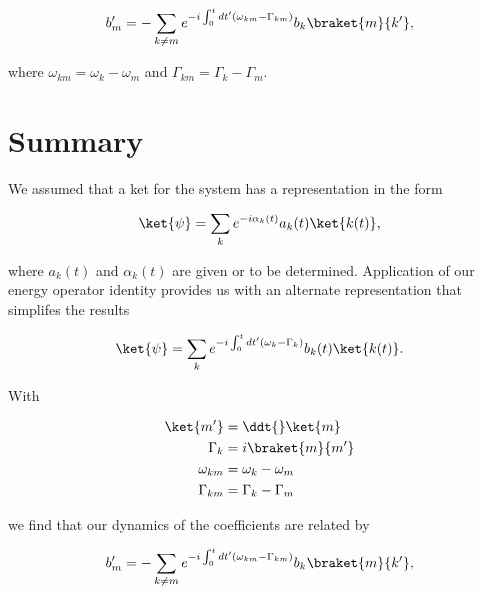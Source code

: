 \begin{equation}\label{eqn:oneMoreAdiabatic:200}
b_m'
=-
\sum_{k \ne m}
e^{- i\int_0^t dt' ( \omega_{km} - \Gamma_{km} ) } 
b_k \braket{m}{k'},
\end{equation}

where $\omega_{km} = \omega_k - \omega_m$ and $\Gamma_{km} = \Gamma_k - \Gamma_m$.

\section{Summary}

We assumed that a ket for the system has a representation in the form

\begin{equation}\label{eqn:oneMoreAdiabatic:220}
\ket{\psi} 
= \sum_k e^{- i \alpha_k(t) } a_k(t) \ket{k(t)},
\end{equation}

where $a_k(t)$ and $\alpha_k(t)$ are given or to be determined.  Application of our energy operator identity provides us with an alternate representation that simplifes the results

\begin{equation}\label{eqn:oneMoreAdiabatic:220}
\ket{\psi} 
= \sum_k e^{- i\int_0^t dt' ( \omega_k - \Gamma_k ) } b_k(t) \ket{k(t)}.
\end{equation}

With

\begin{align}\label{eqn:oneMoreAdiabatic:260}
\ket{m'} &= \ddt{} \ket{m} \\
\Gamma_k &= i \braket{m}{m'} \\
\omega_{km} &= \omega_k - \omega_m \\
\Gamma_{km} &= \Gamma_k - \Gamma_m
\end{align}

we find that our dynamics of the coefficients are related by

\begin{equation}\label{eqn:oneMoreAdiabatic:280}
b_m'
=-
\sum_{k \ne m}
e^{- i\int_0^t dt' ( \omega_{km} - \Gamma_{km} ) } 
b_k \braket{m}{k'},
\end{equation}

\EndNoBibArticle
